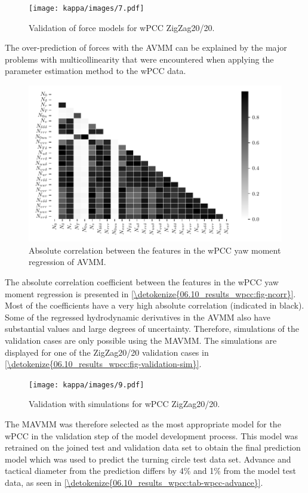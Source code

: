 \begin{figure}[h!]
\centering
\texttt{[image: kappa/images/7.pdf]}
\caption{Validation of force models for wPCC ZigZag20/20.}\label{fig:validation-forces}
\end{figure}
\noindent The over-prediction of forces with the AVMM can be explained by the major problems with multicollinearity that were encountered when applying the parameter estimation method to the wPCC data.
\begin{figure}[ht!]
\centering
\includegraphics[width=1.0\textwidth]{kappa/images/10.pdf}
\caption{Absolute correlation between the features in the wPCC yaw moment regression of AVMM.}\label{\detokenize{06.10_results_wpcc:fig-ncorr}}
\end{figure}
\clearpage
The absolute correlation coefficient between the features in the wPCC yaw moment regression is presented in \hyperref[\detokenize{06.10_results_wpcc:fig-ncorr}]{\autoref{\detokenize{06.10_results_wpcc:fig-ncorr}}}. Most of the coefficients have a very high absolute correlation (indicated in black). Some of the regressed hydrodynamic derivatives in the AVMM also have substantial values and large degrees of uncertainty. Therefore, simulations of the validation cases are only possible using the MAVMM. The simulations are displayed for one of the ZigZag20/20 validation cases in \hyperref[\detokenize{06.10_results_wpcc:fig-validation-sim}]{\autoref{\detokenize{06.10_results_wpcc:fig-validation-sim}}}.
\begin{figure}[h!]
\centering
\texttt{[image: kappa/images/9.pdf]}
\caption{Validation with simulations for wPCC ZigZag20/20.}\label{\detokenize{06.10_results_wpcc:fig-validation-sim}}\end{figure}
The MAVMM was therefore selected as the most appropriate model for the wPCC in the validation step of the model development process. This model was retrained on the joined test and validation data set to obtain the final prediction model which was used to predict the turning circle test data set. Advance and tactical diameter \cite{imo_standards_2002} from the prediction differs by 4\% and 1\% from the model test data, as seen in \autoref{\detokenize{06.10_results_wpcc:tab-wpcc-advance}}.
